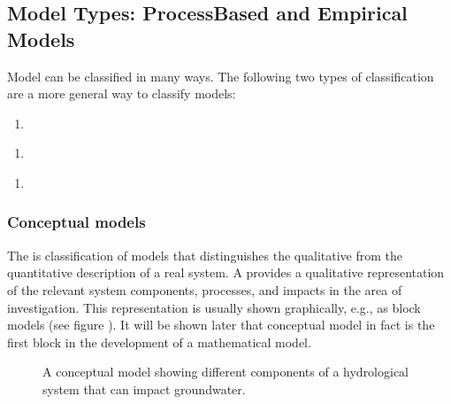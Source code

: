 \documentclass[letterpaper,10pt,english]{jupyterBook}
\begin{document}
\subsection{Model Types: Process\sphinxhyphen{}Based and Empirical Models}
\label{\detokenize{content/modeling/31_intro_modeling:model-types-process-based-and-empirical-models}}
\sphinxAtStartPar
Model can be classified in many ways. The following two types of classification are a more general way to classify models:
\begin{enumerate}
%
\item {} 
\sphinxAtStartPar
{}

\end{enumerate}
\begin{enumerate}
%
\item {} 
\sphinxAtStartPar
{}

\end{enumerate}
\begin{enumerate}
%
\item {} 
\sphinxAtStartPar
{}

\end{enumerate}


\subsubsection{Conceptual models}
\label{\detokenize{content/modeling/31_intro_modeling:conceptual-models}}
\sphinxAtStartPar
The  is classification of models that distinguishes the qualitative from the quantitative description of a real system. A  provides a qualitative representation of the relevant system components, processes, and impacts in the area of investigation. This representation is usually shown graphically, e.g., as block models (see figure {\hyperref[\detokenize{content/modeling/31_intro_modeling:cmodel}]{}}). It will be shown later that conceptual model in fact is the first block in the development of a mathematical model.

\begin{figure}[htbp]
\centering
\capstart

\noindent{}
\caption{A conceptual model showing different components of a hydrological system that can impact groundwater.}\label{\detokenize{content/modeling/31_intro_modeling:cmodel}}\end{figure}
\end{document}
